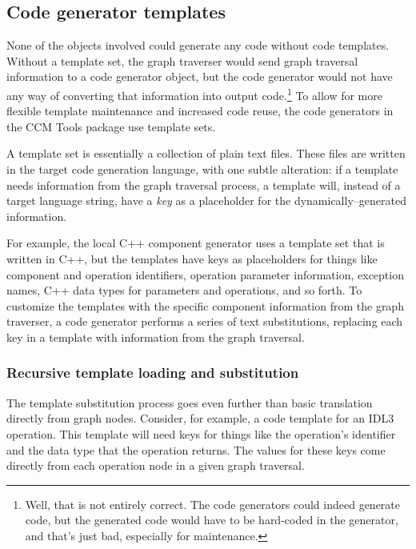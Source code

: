 \subsection{Code generator templates}

None of the objects involved could generate any code without code templates.
Without a template set, the graph traverser would send graph traversal
information to a code generator object, but the code generator would not have
any way of converting that information into output code.\footnote{Well, that is
not entirely correct. The code generators could indeed generate code, but the
generated code would have to be hard-coded in the generator, and that's just
bad, especially for maintenance.} To allow for more flexible template
maintenance and increased code reuse, the code generators in the CCM Tools
package use template sets.

A template set is essentially a collection of plain text files. These files are
written in the target code generation language, with one subtle alteration: if a
template needs information from the graph traversal process, a template will,
instead of a target language string, have a {\em key\/} as a placeholder for the
dynamically--generated information.

For example, the local C++ component generator uses a template set that is
written in C++, but the templates have keys as placeholders for things like
component and operation identifiers, operation parameter information, exception
names, C++ data types for parameters and operations, and so forth. To customize
the templates with the specific component information from the graph traverser,
a code generator performs a series of text substitutions, replacing each key in
a template with information from the graph traversal.

\subsubsection{Recursive template loading and substitution}

The template substitution process goes even further than basic translation
directly from graph nodes. Consider, for example, a code template for an IDL3
operation. This template will need keys for things like the operation's
identifier and the data type that the operation returns. The values for these
keys come directly from each operation node in a given graph traversal.

